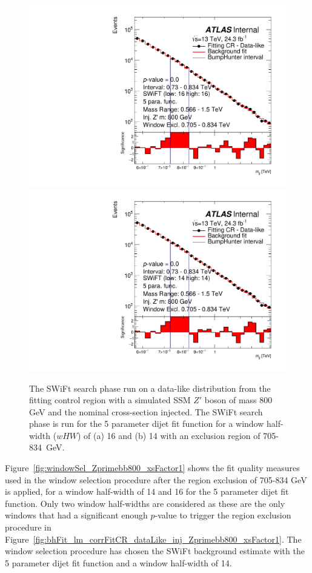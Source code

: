 \begin{figure}[!htb]
\captionsetup[subfigure]{aboveskip=0pt,justification=centering}
\centering
{} {
  \includegraphics[width=0.45\linewidth, angle=0]{figs/Dibjet/LowMass/FitStudy_min566/bhFit_corrFitCR_dataLike_5para_low16_high16_inj_Zprimebb800_xsFactor1_removedWindow.pdf}
}
 {
  \includegraphics[width=0.45\linewidth, angle=0]{figs/Dibjet/LowMass/FitStudy_min566/bhFit_corrFitCR_dataLike_5para_low14_high14_inj_Zprimebb800_xsFactor1_removedWindow.pdf}
}

\caption{\label{fig:bhFit_lm_corrFitCR_dataLike_inj_Zprimebb800_xsFactor1_removedWindow}
  The SWiFt search phase run on a data-like distribution
  from the fitting control region with a simulated SSM $Z'$ boson of mass 800 GeV and the nominal cross-section injected.
  The SWiFt search phase is run for the 5 parameter dijet fit function for a window half-width ($wHW$) of (a) 16 and (b) 14
  with an exclusion region of 705-834~GeV.}
\end{figure}

Figure~\ref{fig:windowSel_Zprimebb800_xsFactor1} shows the fit quality measures used in the window selection procedure after the region exclusion of 705-834 GeV is applied,
for a window half-width of 14 and 16 for the 5 parameter dijet fit function.
Only two window half-widths are considered as these are the only windows that had a significant enough $p$-value to trigger the region exclusion procedure in
Figure~\ref{fig:bhFit_lm_corrFitCR_dataLike_inj_Zprimebb800_xsFactor1}.
The window selection procedure has chosen the SWiFt background estimate with the 5 parameter dijet fit function and a window half-width of 14.

